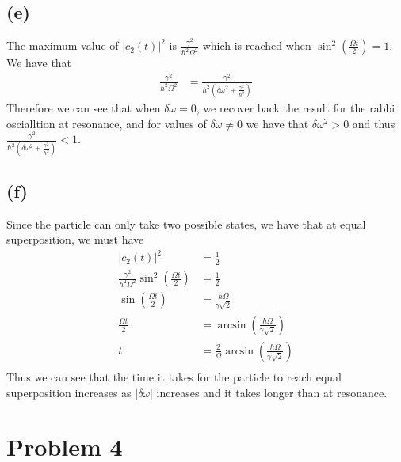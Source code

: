 \documentclass[11pt]{article}
\begin{document}
\subsection*{(e)}
The maximum value of $|c_2(t)|^2$ is $\frac{\gamma^2}{\hbar^2\Omega^2}$ which is reached when $\sin^2\left(\frac{\Omega t}{2}\right) = 1$.
We have that 
\begin{align*}
    \frac{\gamma^2}{\hbar^2\Omega^2} &= \frac{\gamma^2}{\hbar^2(\delta\omega^2+\frac{\gamma^2}{\hbar^2})}
\end{align*}
Therefore we can see that when $\delta\omega=0$, we recover back the result for the 
rabbi oscialltion at resonance, and for values of $\delta\omega\neq 0$ we have that 
$\delta\omega^2>0$ and thus $\frac{\gamma^2}{\hbar^2(\delta\omega^2+\frac{\gamma^2}{\hbar^2})}<1$.
\subsection*{(f)}
Since the particle can only take two possible states, 
we have that at equal superposition, we must have 
\begin{align*}
    |c_{2}(t)|^2 &= \frac{1}{2}\\
    \frac{\gamma^2}{\hbar^2\Omega^2}\sin^2\left(\frac{\Omega t}{2}\right) &= \frac{1}{2}\\
    \sin\left(\frac{\Omega t}{2}\right) &= \frac{\hbar \Omega}{\gamma\sqrt{2}}\\
    \frac{\Omega t}{2} &= \arcsin\left(\frac{\hbar \Omega}{\gamma\sqrt{2}}\right)\\
    t &= \frac{2}{\Omega}\arcsin\left(\frac{\hbar \Omega}{\gamma\sqrt{2}}\right)\\
\end{align*}
Thus we can see that the time it takes for the particle to reach equal superposition increases
as $|\delta\omega|$ increases and it takes longer than 
at resonance.
\section*{Problem 4}
\end{document}
